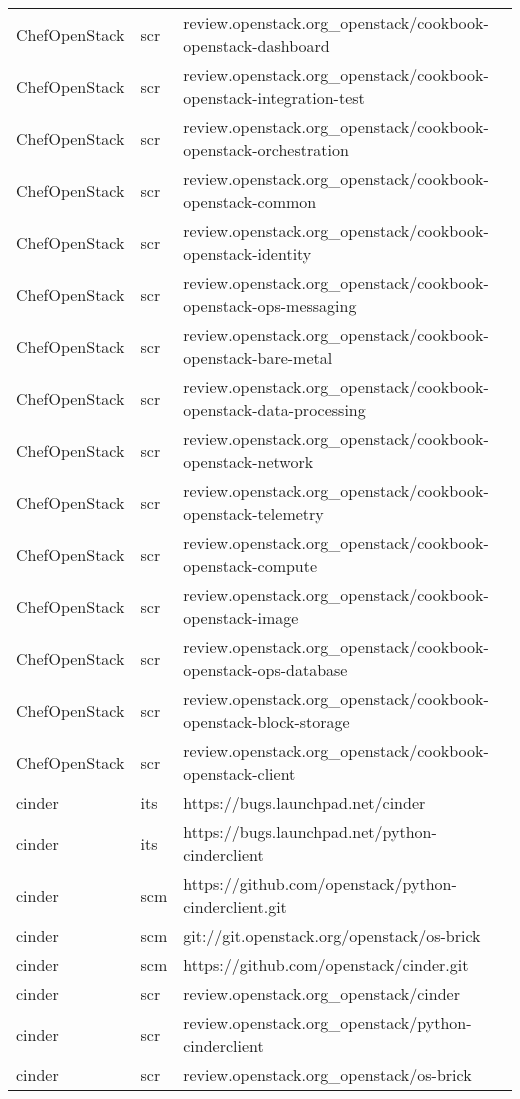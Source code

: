 \begin{center}
\begin{longtable}{|p{4cm}|p{1cm}|p{10cm}|}
ChefOpenStack&scr&review.openstack.org\_openstack/cookbook-openstack-dashboard\\ 
ChefOpenStack&scr&review.openstack.org\_openstack/cookbook-openstack-integration-test\\ 
ChefOpenStack&scr&review.openstack.org\_openstack/cookbook-openstack-orchestration\\ 
ChefOpenStack&scr&review.openstack.org\_openstack/cookbook-openstack-common\\ 
ChefOpenStack&scr&review.openstack.org\_openstack/cookbook-openstack-identity\\ 
ChefOpenStack&scr&review.openstack.org\_openstack/cookbook-openstack-ops-messaging\\ 
ChefOpenStack&scr&review.openstack.org\_openstack/cookbook-openstack-bare-metal\\ 
ChefOpenStack&scr&review.openstack.org\_openstack/cookbook-openstack-data-processing\\ 
ChefOpenStack&scr&review.openstack.org\_openstack/cookbook-openstack-network\\ 
ChefOpenStack&scr&review.openstack.org\_openstack/cookbook-openstack-telemetry\\ 
ChefOpenStack&scr&review.openstack.org\_openstack/cookbook-openstack-compute\\ 
ChefOpenStack&scr&review.openstack.org\_openstack/cookbook-openstack-image\\ 
ChefOpenStack&scr&review.openstack.org\_openstack/cookbook-openstack-ops-database\\ 
ChefOpenStack&scr&review.openstack.org\_openstack/cookbook-openstack-block-storage\\ 
ChefOpenStack&scr&review.openstack.org\_openstack/cookbook-openstack-client\\ 
cinder&its&https://bugs.launchpad.net/cinder\\ 
cinder&its&https://bugs.launchpad.net/python-cinderclient\\ 
cinder&scm&https://github.com/openstack/python-cinderclient.git\\ 
cinder&scm&git://git.openstack.org/openstack/os-brick\\ 
cinder&scm&https://github.com/openstack/cinder.git\\ 
cinder&scr&review.openstack.org\_openstack/cinder\\ 
cinder&scr&review.openstack.org\_openstack/python-cinderclient\\ 
cinder&scr&review.openstack.org\_openstack/os-brick\\ 

\end{longtable}
\end{center}
